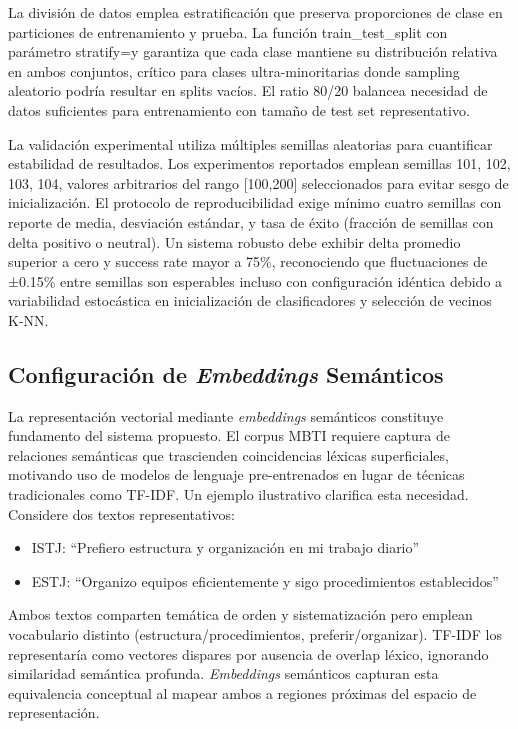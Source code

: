 La división de datos emplea estratificación que preserva proporciones de clase en particiones de entrenamiento y prueba. La función train\_test\_split con parámetro stratify=y garantiza que cada clase mantiene su distribución relativa en ambos conjuntos, crítico para clases ultra-minoritarias donde sampling aleatorio podría resultar en splits vacíos. El ratio 80/20 balancea necesidad de datos suficientes para entrenamiento con tamaño de test set representativo.

La validación experimental utiliza múltiples semillas aleatorias para cuantificar estabilidad de resultados. Los experimentos reportados emplean semillas {101, 102, 103, 104}, valores arbitrarios del rango [100,200] seleccionados para evitar sesgo de inicialización. El protocolo de reproducibilidad exige mínimo cuatro semillas con reporte de media, desviación estándar, y tasa de éxito (fracción de semillas con delta positivo o neutral). Un sistema robusto debe exhibir delta promedio superior a cero y success rate mayor a 75\%, reconociendo que fluctuaciones de ±0.15\% entre semillas son esperables incluso con configuración idéntica debido a variabilidad estocástica en inicialización de clasificadores y selección de vecinos K-NN.

\subsection{Configuración de \textit{Embeddings} Semánticos}
\label{subsec:embeddings}

La representación vectorial mediante \textit{embeddings} semánticos constituye fundamento del sistema propuesto. El corpus MBTI requiere captura de relaciones semánticas que trascienden coincidencias léxicas superficiales, motivando uso de modelos de lenguaje pre-entrenados en lugar de técnicas tradicionales como TF-IDF. Un ejemplo ilustrativo clarifica esta necesidad. Considere dos textos representativos:

\begin{itemize}
\item ISTJ: ``Prefiero estructura y organización en mi trabajo diario''
\item ESTJ: ``Organizo equipos eficientemente y sigo procedimientos establecidos''
\end{itemize}

Ambos textos comparten temática de orden y sistematización pero emplean vocabulario distinto (estructura/procedimientos, preferir/organizar). TF-IDF los representaría como vectores dispares por ausencia de overlap léxico, ignorando similaridad semántica profunda. \textit{Embeddings} semánticos capturan esta equivalencia conceptual al mapear ambos a regiones próximas del espacio de representación.

